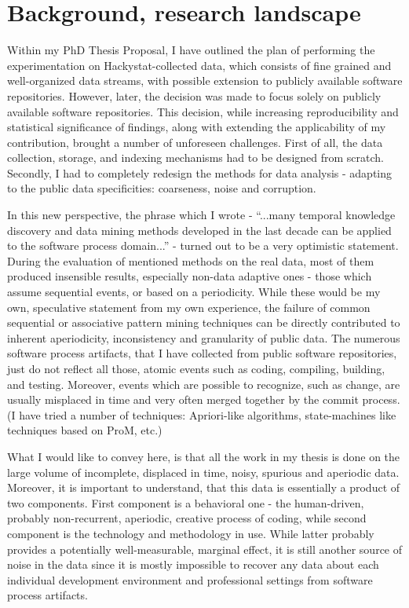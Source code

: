 \documentclass[11pt,oneside]{article}
\numberwithin{equation}{subsection}
\begin{document}
\section{Background, research landscape}
Within my PhD Thesis Proposal, I have outlined the plan of performing the experimentation on
Hackystat-collected data, which consists of fine grained and well-organized data streams, with possible 
extension to publicly available software repositories. 
However, later, the decision was made to focus solely on publicly available software repositories. This
decision, while increasing reproducibility and statistical significance of findings, along with extending 
the applicability of my contribution, brought a number of unforeseen challenges. First of all, the data
collection, storage, and indexing mechanisms had to be designed from scratch. Secondly, I had to
completely redesign the methods for data analysis - adapting to the public data specificities:
coarseness, noise and corruption.

In this new perspective, the phrase which I wrote - ``...many temporal knowledge discovery and
data mining methods developed in the last decade can be applied to the software process domain...''
- turned out to be a very optimistic statement. During the evaluation of mentioned methods on the
real data, most of them produced insensible results, especially non-data adaptive ones - those which
assume sequential events, or based on a periodicity. While these would be my own, speculative
statement from my own experience, the failure of common sequential or associative pattern
mining techniques can be directly contributed to inherent aperiodicity, inconsistency and
granularity of public data. The numerous software process artifacts, that I have collected from
public software repositories, just do not reflect all those, atomic events such as coding,
compiling, building, and testing. Moreover, events which are possible to recognize, such as change,
are usually misplaced in time and very often merged together by the commit process. (I have tried a
number of techniques: Apriori-like algorithms, state-machines like techniques based on ProM, etc.)

What I would like to convey here, is that all the work in my thesis is done on the large volume
of incomplete, displaced in time, noisy, spurious and aperiodic data. Moreover, it is
important to understand, that this data is essentially a product of two components. First component
is a behavioral one - the human-driven, probably non-recurrent, aperiodic, creative process of
coding, while second component is the technology and methodology in use. While latter probably
provides a potentially well-measurable, marginal effect, it is still another source of noise in the
data since it is mostly impossible to recover any data about each individual development
environment and professional settings from software process artifacts.
\end{document}
